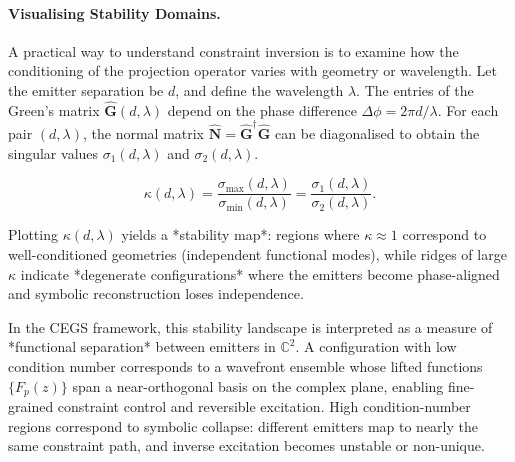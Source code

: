 \documentclass[11pt]{article}
\theoremstyle{plain}
\theoremstyle{definition}
\theoremstyle{remark}
\begin{document}
\paragraph{Visualising Stability Domains.}

A practical way to understand constraint inversion is to examine how the
conditioning of the projection operator varies with geometry or
wavelength.  
Let the emitter separation be \(d\), and define the wavelength
\(\lambda\).  
The entries of the Green’s matrix
\(\hat{\mathbf{G}}(d,\lambda)\)
depend on the phase difference
\(\Delta \phi = 2\pi d / \lambda\).
For each pair \((d,\lambda)\),
the normal matrix
\(\hat{\mathbf{N}} = \hat{\mathbf{G}}^\dagger \hat{\mathbf{G}}\)
can be diagonalised to obtain the singular values
\(\sigma_1(d,\lambda)\) and \(\sigma_2(d,\lambda)\).

\[
\kappa(d,\lambda)
  = \frac{\sigma_{\max}(d,\lambda)}{\sigma_{\min}(d,\lambda)}
  = \frac{\sigma_1(d,\lambda)}{\sigma_2(d,\lambda)}.
\]

Plotting \(\kappa(d,\lambda)\) yields a *stability map*:
regions where \(\kappa \approx 1\) correspond to well-conditioned
geometries (independent functional modes),
while ridges of large \(\kappa\) indicate *degenerate configurations*
where the emitters become phase-aligned and symbolic reconstruction
loses independence.

\vspace{6pt}
\noindent
In the CEGS framework, this stability landscape is interpreted as a
measure of *functional separation* between emitters in
\(\mathbb{C}^2\).  
A configuration with low condition number corresponds to a
wavefront ensemble whose lifted functions
\(\{F_p(z)\}\)
span a near-orthogonal basis on the complex plane,
enabling fine-grained constraint control and reversible excitation.
High condition-number regions correspond to symbolic collapse:
different emitters map to nearly the same constraint path, and
inverse excitation becomes unstable or non-unique.

\begin{center}
\end{center}
\end{document}
